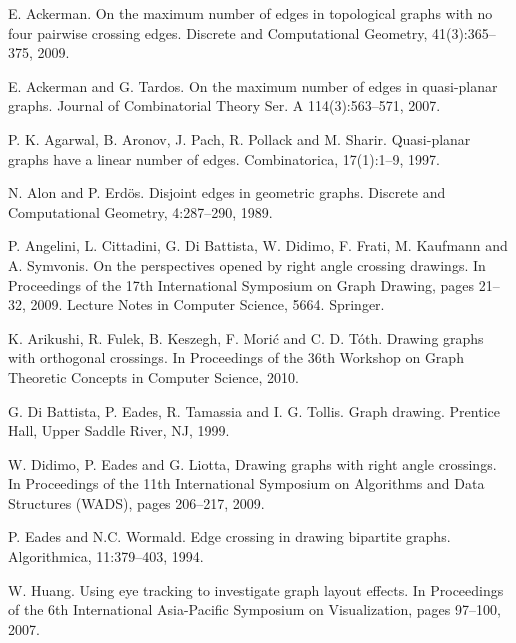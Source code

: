 \documentclass{patmorin}
\begin{document}
 \begin{thebibliography}{99}

   E. Ackerman.
   \newblock On the maximum number of edges in topological graphs with no four pairwise crossing edges.
   \newblock Discrete and Computational Geometry, 41(3):365--375, 2009.

   E. Ackerman and G. Tardos.
   \newblock On the maximum number of edges in quasi-planar graphs.
   \newblock Journal of Combinatorial Theory Ser. A 114(3):563--571, 2007.

   P. K. Agarwal, B. Aronov, J. Pach, R. Pollack and M. Sharir.
   \newblock Quasi-planar graphs have a linear number of edges.
   \newblock Combinatorica, 17(1):1--9, 1997.

    N. Alon and P. Erd\"{o}s.
    \newblock Disjoint edges in geometric graphs.
    \newblock Discrete and Computational Geometry, 4:287--290, 1989.

   P. Angelini, L. Cittadini, G. Di Battista, W. Didimo, F. Frati, M. Kaufmann and A. Symvonis.
   \newblock On the perspectives opened by right angle crossing drawings.
   \newblock In Proceedings of the 17th International Symposium on Graph Drawing, pages 21--32, 2009. 
             Lecture Notes in Computer Science, 5664. Springer.

   K. Arikushi, R. Fulek, B. Keszegh, F. Mori\'{c} and C. D. T\'{o}th.
   \newblock Drawing graphs with orthogonal crossings.
   \newblock In Proceedings of the 36th Workshop on Graph Theoretic Concepts in Computer Science, 2010.

   G. Di Battista, P. Eades, R. Tamassia and I. G. Tollis.
   \newblock Graph drawing.
   \newblock Prentice Hall, Upper Saddle River, NJ, 1999.

   W. Didimo, P. Eades and G. Liotta,
   \newblock Drawing graphs with right angle crossings.
   \newblock In Proceedings of the 11th International Symposium on Algorithms and Data Structures (WADS), pages 206--217, 2009.



   P. Eades and N.C. Wormald.
   \newblock Edge crossing in drawing bipartite graphs.
   \newblock Algorithmica, 11:379--403, 1994.

   W. Huang.
   \newblock Using eye tracking to investigate graph layout effects.
   \newblock In Proceedings of the 6th International Asia-Pacific Symposium on
                Visualization, pages 97--100, 2007.


\end{thebibliography}
\end{document}

